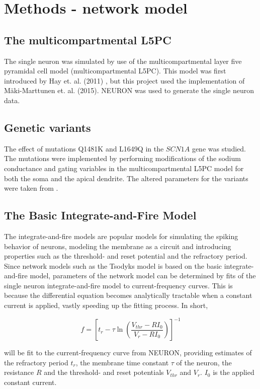 \section*{Methods - network model}
\subsection*{The multicompartmental L5PC}
The single neuron was simulated by use of the multicompartmental layer five pyramidal cell model (multicompartmental L5PC). This model was first introduced by Hay et. al. (2011) \cite{hay2011models}, but this project used the implementation of M\"aki-Marttunen et. al. (2015)\cite{maki2016functional}. NEURON was used to generate the single neuron data.

\subsection*{Genetic variants}
The effect of mutations Q1481K and L1649Q in the $SCN1A$ gene was studied. The mutations were implemented by performing modifications of the sodium conductance and gating variables in the multicompartmental L5PC model for both the soma and the apical dendrite. The altered parameters for the variants were taken from \cite{maki2016functional}.
\subsection*{The Basic Integrate-and-Fire Model}

The integrate-and-fire models are popular models for simulating the spiking behavior of neurons, modeling the membrane as a circuit and introducing properties such as the threshold- and reset potential and the refractory period\cite{i-and-f}. Since network models such as the Tsodyks model is based on the basic integrate-and-fire model\cite{tsodyks2000synchrony}, parameters of the network model can be determined by fits of the single neuron integrate-and-fire model to current-frequency curves. This is because the differential equation becomes analytically tractable when a constant current is applied, vastly speeding up the fitting process. In short, 

\begin{equation}
 f = \left[ t_r - \tau\ln\left(\frac{V_{thr}-RI_0}{V_{r}-RI_0}\right) \right]^{-1}
 \label{eq:frequency}
\end{equation}

will be fit to the current-frequency curve from NEURON, providing estimates of the refractory period $t_r$, the membrane time constant $\tau$ of the neuron, the resistance $R$ and the threshold- and reset potentials $V_{thr}$ and $V_{r}$. $I_0$ is the applied constant current.

